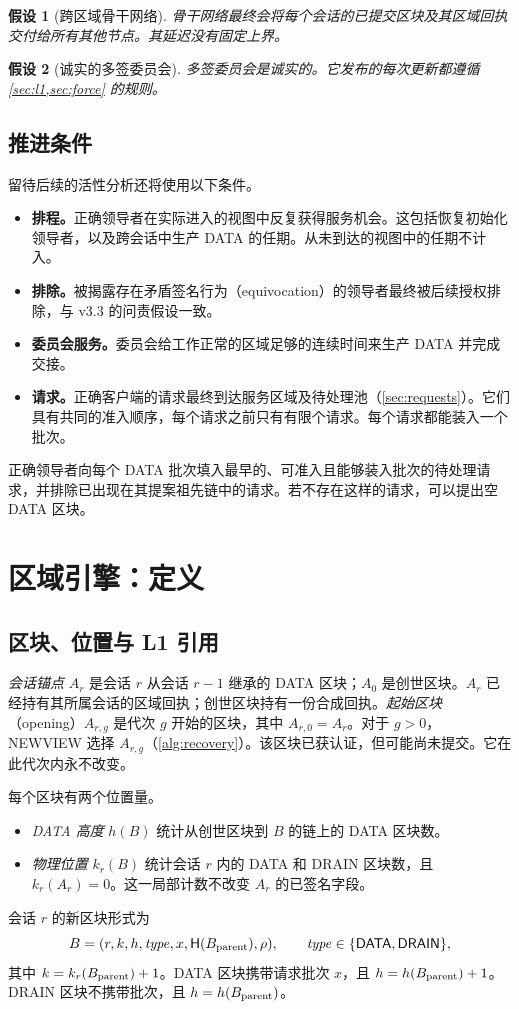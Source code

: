 \documentclass[11pt,a4paper]{article}
\newcommand{\Hash}{\mathsf H}
\newcommand{\tagg}[1]{\ensuremath{\mathsf{#1}}}
\newtheorem{assumption}[assumption]{假设}
\begin{document}
\begin{assumption}[跨区域骨干网络]\label{ass:backbone}
骨干网络最终会将每个会话的已提交区块及其区域回执交付给所有其他节点。其延迟没有固定上界。
\end{assumption}

\begin{assumption}[诚实的多签委员会]\label{ass:committee}
多签委员会是诚实的。它发布的每次更新都遵循\cref{sec:l1,sec:force} 的规则。
\end{assumption}

\subsection{推进条件}\label{sec:progress}
留待后续的活性分析还将使用以下条件。
\begin{itemize}
\item \textbf{排程。}正确领导者在实际进入的视图中反复获得服务机会。这包括恢复初始化领导者，以及跨会话中生产 DATA 的任期。从未到达的视图中的任期不计入。
\item \textbf{排除。}被揭露存在矛盾签名行为（equivocation）的领导者最终被后续授权排除，与 v3.3 的问责假设一致。
\item \textbf{委员会服务。}委员会给工作正常的区域足够的连续时间来生产 DATA 并完成交接。
\item \textbf{请求。}正确客户端的请求最终到达服务区域及待处理池（\cref{sec:requests}）。它们具有共同的准入顺序，每个请求之前只有有限个请求。每个请求都能装入一个批次。
\end{itemize}
正确领导者向每个 DATA 批次填入最早的、可准入且能够装入批次的待处理请求，并排除已出现在其提案祖先链中的请求。若不存在这样的请求，可以提出空 DATA 区块。

\section{区域引擎：定义}\label{sec:regional}
\subsection{区块、位置与 L1 引用}\label{sec:blocks}
\emph{会话锚点} $A_r$ 是会话 $r$ 从会话 $r-1$ 继承的 DATA 区块；$A_0$ 是创世区块。$A_r$ 已经持有其所属会话的区域回执；创世区块持有一份合成回执。\emph{起始区块}（opening）$A_{r,g}$ 是代次 $g$ 开始的区块，其中 $A_{r,0}=A_r$。对于 $g>0$，NEWVIEW 选择 $A_{r,g}$（\cref{alg:recovery}）。该区块已获认证，但可能尚未提交。它在此代次内永不改变。

每个区块有两个位置量。
\begin{itemize}
\item \emph{DATA 高度} $h(B)$ 统计从创世区块到 $B$ 的链上的 DATA 区块数。
\item \emph{物理位置} $k_r(B)$ 统计会话 $r$ 内的 DATA 和 DRAIN 区块数，且 $k_r(A_r)=0$。这一局部计数不改变 $A_r$ 的已签名字段。
\end{itemize}
会话 $r$ 的新区块形式为
\[
 B=(r,k,h,\mathit{type},x,\Hash(B_{\rm parent}),\rho),
 \qquad \mathit{type}\in\{\tagg{DATA},\tagg{DRAIN}\},
\]
其中 $k=k_r(B_{\rm parent})+1$。DATA 区块携带请求批次 $x$，且 $h=h(B_{\rm parent})+1$。DRAIN 区块不携带批次，且 $h=h(B_{\rm parent})$。
\end{document}
